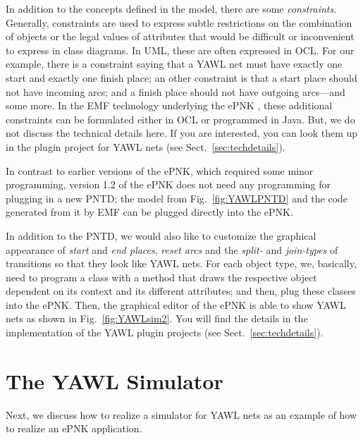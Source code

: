 \documentclass[a4paper]{llncs}
\begin{document}
In addition to the concepts defined in the model, there are some \emph{constraints}.
Generally, constraints are used to express subtle restrictions on the combination
of objects or the legal values of attributes that would be difficult or
inconvenient to express in class diagrams. In UML, these are often expressed
in OCL.  For our example, there is a constraint saying that a YAWL net must
have exactly one start and exactly one finish place; an other constraint is
that a start place should not have incoming arcs; and a finish place should not have outgoing
arcs---and some more. In the EMF technology underlying the ePNK \cite{BSM06}, these additional
constraints can be formulated either in OCL or programmed in Java. But, we do not discuss the
technical details here. If you are interested, you can look them up in the plugin
project for YAWL nets (see Sect.~\ref{sec:techdetails}).

In contrast to earlier versions of the ePNK, which required
some minor programming, version 1.2 of the ePNK does not need any programming for
plugging in a new PNTD; the model from Fig.~\ref{fig:YAWLPNTD} and the code generated
from it by EMF \cite{BSM06} can be plugged directly into the ePNK.

In addition to the PNTD, we would also like to customize the graphical appearance
of \emph{start} and \emph{end places}, \emph{reset arcs} and the \emph{split-} and \emph{join-types}
of transitions so that they look like YAWL nets. For each
object type, we, basically, need to program a class with a method that draws the
respective object dependent on its context and its different attributes; and then,
plug these classes into the ePNK. Then, the graphical editor of the ePNK is
able to show YAWL nets as shown in Fig.~\ref{fig:YAWLsim2}. 
You will find the details in the implementation of the YAWL plugin projects
(see Sect.~\ref{sec:techdetails}).

\section{The YAWL Simulator}
\label{sec:yawl-sim}

Next, we discuss how to realize a
simulator for YAWL nets as an example of how to realize an ePNK application.
\end{document}
